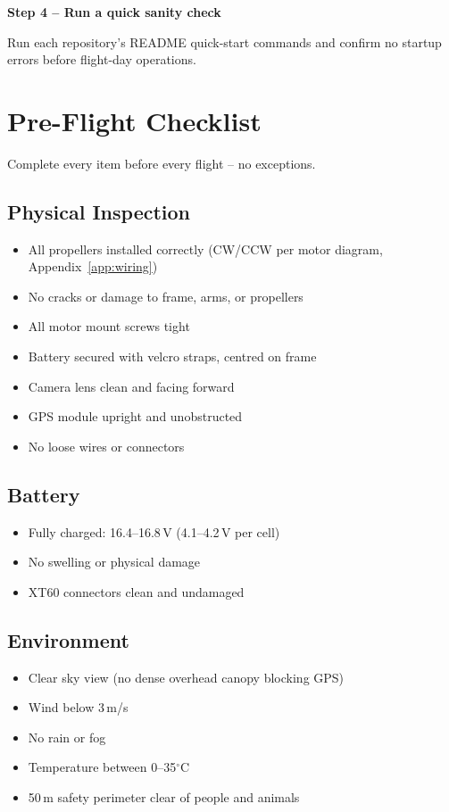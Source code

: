 \documentclass{article}
\begin{document}
\textbf{Step 4 -- Run a quick sanity check}

Run each repository's README quick-start commands and confirm no startup errors before flight-day operations.

\section{Pre-Flight Checklist}

Complete every item before every flight -- no exceptions.

\subsection*{Physical Inspection}
\begin{itemize}
    \item[$\square$] All propellers installed correctly (CW/CCW per motor diagram, Appendix~\ref{app:wiring})
    \item[$\square$] No cracks or damage to frame, arms, or propellers
    \item[$\square$] All motor mount screws tight
    \item[$\square$] Battery secured with velcro straps, centred on frame
    \item[$\square$] Camera lens clean and facing forward
    \item[$\square$] GPS module upright and unobstructed
    \item[$\square$] No loose wires or connectors
\end{itemize}

\subsection*{Battery}
\begin{itemize}
    \item[$\square$] Fully charged: 16.4--16.8\,V (4.1--4.2\,V per cell)
    \item[$\square$] No swelling or physical damage
    \item[$\square$] XT60 connectors clean and undamaged
\end{itemize}

\subsection*{Environment}
\begin{itemize}
    \item[$\square$] Clear sky view (no dense overhead canopy blocking GPS)
    \item[$\square$] Wind below 3\,m/s
    \item[$\square$] No rain or fog
    \item[$\square$] Temperature between 0--35$^\circ$C
    \item[$\square$] 50\,m safety perimeter clear of people and animals
\end{itemize}
\end{document}
